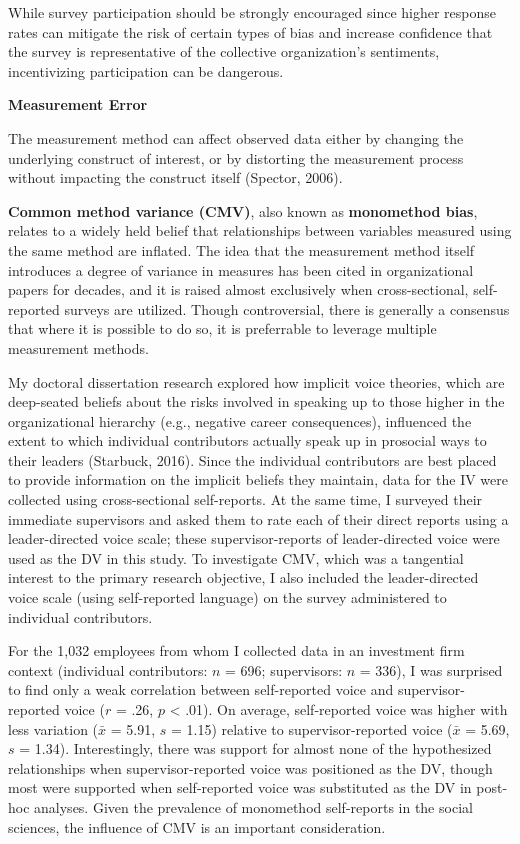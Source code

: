\documentclass[
]{book}
\begin{document}
While survey participation should be strongly encouraged since higher response rates can mitigate the risk of certain types of bias and increase confidence that the survey is representative of the collective organization's sentiments, incentivizing participation can be dangerous.

\textbf{Measurement Error}

The measurement method can affect observed data either by changing the underlying construct of interest, or by distorting the measurement process without impacting the construct itself (Spector, 2006).

\textbf{Common method variance (CMV)}, also known as \textbf{monomethod bias}, relates to a widely held belief that relationships between variables measured using the same method are inflated. The idea that the measurement method itself introduces a degree of variance in measures has been cited in organizational papers for decades, and it is raised almost exclusively when cross-sectional, self-reported surveys are utilized. Though controversial, there is generally a consensus that where it is possible to do so, it is preferrable to leverage multiple measurement methods.

My doctoral dissertation research explored how implicit voice theories, which are deep-seated beliefs about the risks involved in speaking up to those higher in the organizational hierarchy (e.g., negative career consequences), influenced the extent to which individual contributors actually speak up in prosocial ways to their leaders (Starbuck, 2016). Since the individual contributors are best placed to provide information on the implicit beliefs they maintain, data for the IV were collected using cross-sectional self-reports. At the same time, I surveyed their immediate supervisors and asked them to rate each of their direct reports using a leader-directed voice scale; these supervisor-reports of leader-directed voice were used as the DV in this study. To investigate CMV, which was a tangential interest to the primary research objective, I also included the leader-directed voice scale (using self-reported language) on the survey administered to individual contributors.

For the 1,032 employees from whom I collected data in an investment firm context (individual contributors: \(n\) = 696; supervisors: \(n\) = 336), I was surprised to find only a weak correlation between self-reported voice and supervisor-reported voice (\(r\) = .26, \(p\) \textless{} .01). On average, self-reported voice was higher with less variation (\(\bar{x}\) = 5.91, \(s\) = 1.15) relative to supervisor-reported voice (\(\bar{x}\) = 5.69, \(s\) = 1.34). Interestingly, there was support for almost none of the hypothesized relationships when supervisor-reported voice was positioned as the DV, though most were supported when self-reported voice was substituted as the DV in post-hoc analyses. Given the prevalence of monomethod self-reports in the social sciences, the influence of CMV is an important consideration.
\end{document}

